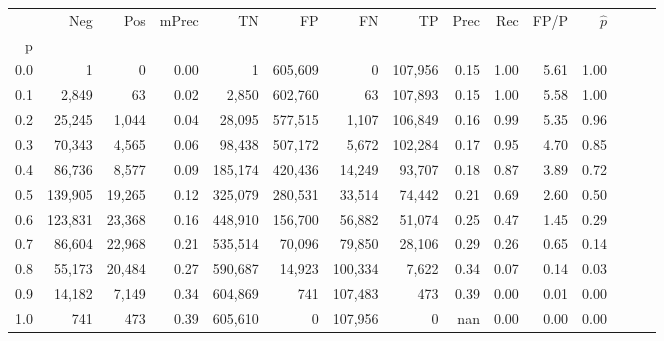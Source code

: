 \begin{tabular}{rrrrrrrrrrrrrrr}
\toprule
{} &      Neg &     Pos & mPrec &       TN &       FP &       FN &       TP &  Prec &   Rec &  FP/P & $\hat{p}$ \\
p   &          &         &       &          &          &          &          &       &       &       &           \\
\midrule
0.0 &        1 &       0 &  0.00 &        1 &  605,609 &        0 &  107,956 &  0.15 &  1.00 &  5.61 &      1.00 \\
0.1 &    2,849 &      63 &  0.02 &    2,850 &  602,760 &       63 &  107,893 &  0.15 &  1.00 &  5.58 &      1.00 \\
0.2 &   25,245 &   1,044 &  0.04 &   28,095 &  577,515 &    1,107 &  106,849 &  0.16 &  0.99 &  5.35 &      0.96 \\
0.3 &   70,343 &   4,565 &  0.06 &   98,438 &  507,172 &    5,672 &  102,284 &  0.17 &  0.95 &  4.70 &      0.85 \\
0.4 &   86,736 &   8,577 &  0.09 &  185,174 &  420,436 &   14,249 &   93,707 &  0.18 &  0.87 &  3.89 &      0.72 \\
0.5 &  139,905 &  19,265 &  0.12 &  325,079 &  280,531 &   33,514 &   74,442 &  0.21 &  0.69 &  2.60 &      0.50 \\
0.6 &  123,831 &  23,368 &  0.16 &  448,910 &  156,700 &   56,882 &   51,074 &  0.25 &  0.47 &  1.45 &      0.29 \\
0.7 &   86,604 &  22,968 &  0.21 &  535,514 &   70,096 &   79,850 &   28,106 &  0.29 &  0.26 &  0.65 &      0.14 \\
0.8 &   55,173 &  20,484 &  0.27 &  590,687 &   14,923 &  100,334 &    7,622 &  0.34 &  0.07 &  0.14 &      0.03 \\
0.9 &   14,182 &   7,149 &  0.34 &  604,869 &      741 &  107,483 &      473 &  0.39 &  0.00 &  0.01 &      0.00 \\
1.0 &      741 &     473 &  0.39 &  605,610 &        0 &  107,956 &        0 &   nan &  0.00 &  0.00 &      0.00 \\
\bottomrule
\end{tabular}
